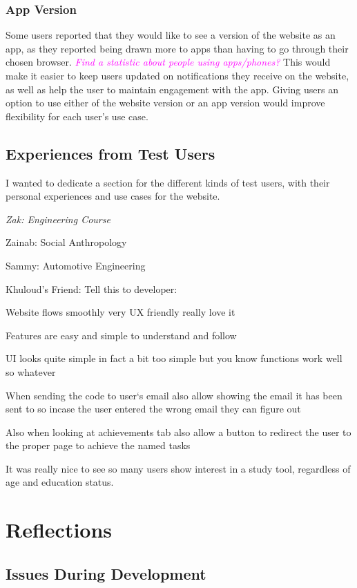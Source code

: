 \documentclass{report}
\begin{document}
\subsection{App Version}

Some users reported that they would like to see a version of the website as an app,
as they reported being drawn more to apps than having to go through their chosen browser.
\textcolor{magenta}{\textit{Find a statistic about people using apps/phones?}}
This would make it easier to keep users updated on notifications they receive on the website,
as well as help the user to maintain engagement with the app.
Giving users an option to use either of the website version or an app version would improve flexibility for each user's use case.

\section{Experiences from Test Users}

I wanted to dedicate a section for the different kinds of test users,
with their personal experiences and use cases for the website.

{\color{magenta}
\itshape
Zak: Engineering Course

Zainab: Social Anthropology

Sammy: Automotive Engineering

Khuloud's Friend: Tell this to developer:

Website flows smoothly very UX friendly really love it

Features are easy and simple to understand and follow

UI looks quite simple in fact a bit too simple but you know functions work well so whatever

When sending the code to user‘s email also allow showing the email it has been sent to so incase the user entered the wrong email they can figure out

Also when looking at achievements tab also allow a button to redirect the user to the proper page to achieve the named tasks

It was really nice to see so many users show interest in a study tool, regardless of age and education status.
}

\chapter{Reflections}

\section{Issues During Development}
\end{document}
